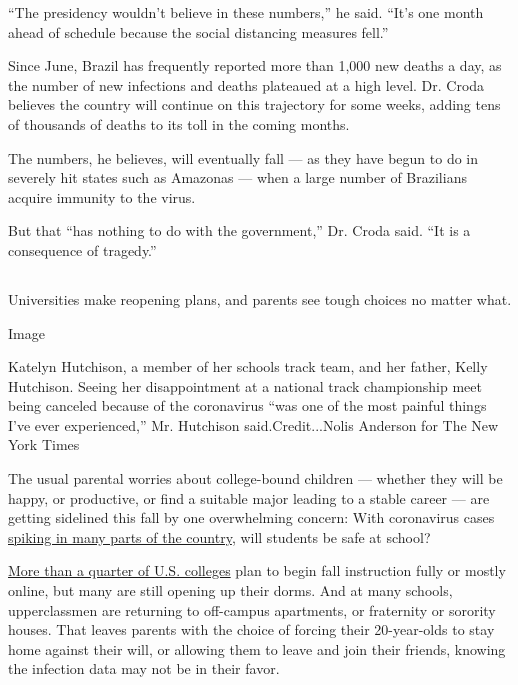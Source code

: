 ``The presidency wouldn't believe in these numbers,'' he said. ``It's
one month ahead of schedule because the social distancing measures
fell.''

Since June, Brazil has frequently reported more than 1,000 new deaths a
day, as the number of new infections and deaths plateaued at a high
level. Dr. Croda believes the country will continue on this trajectory
for some weeks, adding tens of thousands of deaths to its toll in the
coming months.

The numbers, he believes, will eventually fall --- as they have begun to
do in severely hit states such as Amazonas --- when a large number of
Brazilians acquire immunity to the virus.

But that ``has nothing to do with the government,'' Dr. Croda said. ``It
is a consequence of tragedy.''

\hypertarget{section-3}{%
\subsection{}\label{section-3}}

Universities make reopening plans, and parents see tough choices no
matter what.

Image

Katelyn Hutchison, a member of her schools track team, and her father,
Kelly Hutchison. Seeing her disappointment at a national track
championship meet being canceled because of the coronavirus ``was one of
the most painful things I've ever experienced,'' Mr. Hutchison
said.Credit...Nolis Anderson for The New York Times

The usual parental worries about college-bound children --- whether they
will be happy, or productive, or find a suitable major leading to a
stable career --- are getting sidelined this fall by one overwhelming
concern: With coronavirus cases
\href{https://www.nytimes.com/interactive/2020/us/coronavirus-us-cases.html}{spiking
in many parts of the country}, will students be safe at school?

\href{https://collegecrisis.shinyapps.io/dashboard/}{More than a quarter
of U.S. colleges} plan to begin fall instruction fully or mostly online,
but many are still opening up their dorms. And at many schools,
upperclassmen are returning to off-campus apartments, or fraternity or
sorority houses. That leaves parents with the choice of forcing their
20-year-olds to stay home against their will, or allowing them to leave
and join their friends, knowing the infection data may not be in their
favor.

